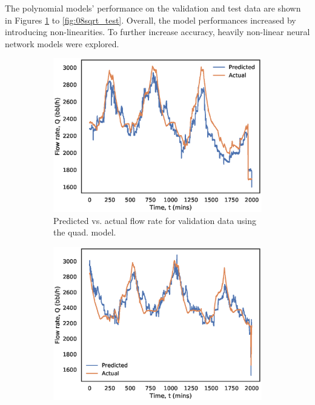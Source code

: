 The polynomial models' performance on the validation and test data are shown in Figures \ref{fig:08quad_validation} to \ref{fig:08sqrt_test}.  Overall, the model performances increased by introducing non-linearities. To further increase accuracy, heavily non-linear neural network models were explored.

\begin{figure}[h]
     \centering
     \begin{subfigure}[b]{0.45\textwidth}
         \centering
         \includegraphics[width=\textwidth]{images/08quad_validation.eps}
         \caption{Predicted vs. actual flow rate for validation data using the quad. model.}
         \label{fig:08quad_validation}
     \end{subfigure}
     \begin{subfigure}[b]{0.45\textwidth}
         \centering
         \includegraphics[width=\textwidth]{images/08quad_test.eps}

\end{subfigure}
\end{figure}
